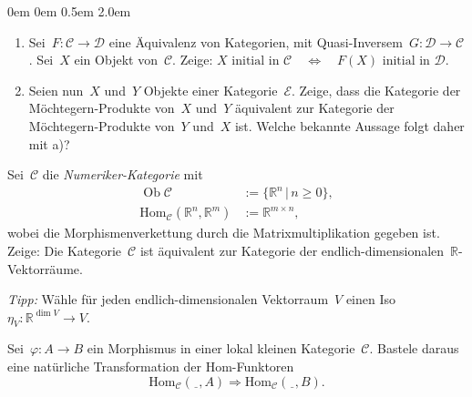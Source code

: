 \documentclass[a4paper,ngerman]{scrartcl}
\theoremstyle{definition}
\theoremstyle{plain}
\theoremstyle{remark}
\newcommand{\R}{\mathbb{R}}
\newcommand{\C}{\mathcal{C}}
\newcommand{\D}{\mathcal{D}}
\newcommand{\E}{\mathcal{E}}
\newcommand{\Hom}{\mathrm{Hom}}
\newcommand{\freist}{\underline{\ \ }}
\DeclareMathOperator{\Ob}{Ob}
\begin{document}
\begin{list}{}{0em \leftmargin0em \itemindent0.5em \itemsep 2.0em}
\item[\textbf{Aufgabe 2:}]\mbox{}
\begin{enumerate}
\item
Sei~$F : \C \to \D$ eine Äquivalenz von Kategorien, mit Quasi-Inversem~$G : \D
\to \C$. Sei~$X$ ein Objekt von~$\C$. Zeige:
$\text{$X$ initial in~$\C$} \quad\Longleftrightarrow\quad
  \text{$F(X)$ initial in~$\D$.}$
\item
Seien nun~$X$ und~$Y$ Objekte einer Kategorie~$\E$. Zeige, dass die Kategorie der
Möchtegern-Produkte von~$X$ und~$Y$ äquivalent zur Kategorie der
Möchtegern-Produkte von~$Y$ und~$X$ ist. Welche bekannte Aussage folgt daher
mit a)?
\end{enumerate}

\item[\textbf{Aufgabe 3:}]
Sei~$\C$ die \emph{Numeriker-Kategorie} mit
\begin{align*}
  \Ob \C &:= \{ \R^n \,|\, n \geq 0 \}, \\
  \Hom_\C(\R^n, \R^m) &:= \R^{m \times n},
\end{align*}
wobei die Morphismenverkettung durch die Matrixmultiplikation gegeben ist.
Zeige: Die Kategorie~$\C$ ist äquivalent zur Kategorie der
endlich-dimensionalen~$\R$-Vektorräume.

\emph{Tipp:} Wähle für jeden endlich-dimensionalen Vektorraum~$V$ einen Iso
$\eta_V : \R^{\dim V} \to V$.

\item[\textbf{Projektaufgabe:}]
Sei~$\varphi : A \to B$ ein Morphismus in einer lokal kleinen Kategorie~$\C$.
Bastele daraus eine natürliche Transformation der Hom-Funktoren
\[ \Hom_\C(\freist, A) \Longrightarrow \Hom_\C(\freist, B). \]
\end{list}
\end{document}
